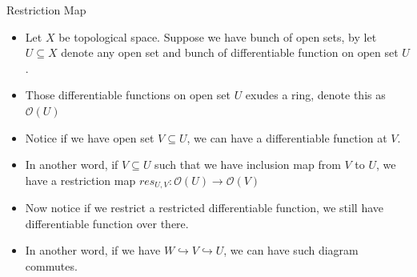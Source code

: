 \documentclass[10pt,aspectratio=1610]{beamer}
\theoremstyle{definition}
\begin{document}
    \begin{frame}{Restriction Map}
        \begin{itemize}
            \item Let $X$ be topological space. Suppose we have bunch of open sets, by let $U \subseteq X$ denote any open set and bunch of differentiable function on open set $U$. 
            \item Those differentiable functions on open set $U$ exudes a ring, denote this as $\mathcal{O}(U)$
            \item Notice if we have open set $V \subseteq U$, we can have a differentiable function at $V$. 
            \item In another word, if $V \subseteq U$ such that we have inclusion map from $V$ to $U$, we have a restriction map $res_{U, V}: \mathcal{O}(U) \to \mathcal{O}(V)$ 
             
        \end{itemize}
        
    \end{frame}

    \begin{frame}[fragile]
        \begin{itemize}
            \item Now notice if we restrict a restricted differentiable function, we still have differentiable function over there.
            \item In another word, if we have $W \hookrightarrow V \hookrightarrow U$, we can have such diagram commutes.
            \begin{figure}
                \centering
            \end{figure}
            
        \end{itemize}
    \end{frame}
\end{document}

